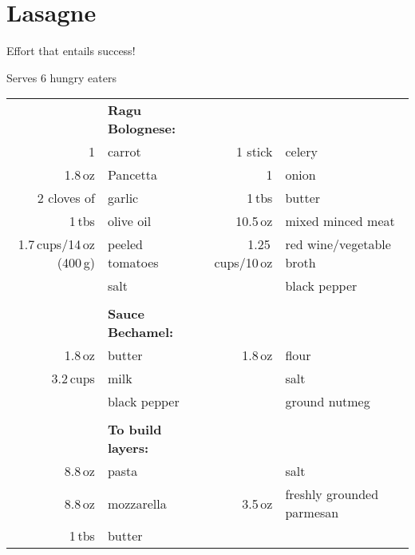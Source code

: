 \section*{Lasagne}
\large{Effort that entails success!}
\begin{centering}
Serves 6 hungry eaters
\end{centering}
\begin{table}[H]
  \centering
  \begin{tabular*}{1\textwidth}{rlrl}
    &\textbf{Ragu Bolognese:}&&\\
    1 & carrot & 1 stick & celery \\
    1.8\,oz  & Pancetta & 1 & onion \\
    2 cloves of & garlic &1\,tbs & butter\\
    1\,tbs & olive oil & 10.5\,oz&mixed minced meat\\
    1.7\,cups/14\,oz (400\,g)&peeled tomatoes&1.25\,cups/10\,oz& red wine/vegetable broth\\
    &salt & & black pepper\\
    &&&\\

    &\textbf{Sauce Bechamel:}&&\\
    1.8\,oz & butter & 1.8\,oz & flour \\
    3.2\,cups & milk & & salt \\
    &black pepper& & ground nutmeg\\
    &&&\\
    &\textbf{To build layers:}&&\\
    8.8\,oz & pasta  & & salt\\
    8.8\,oz & mozzarella & 3.5\,oz & freshly grounded parmesan\\
    1\,tbs & butter
  \end{tabular*}
\end{table}

